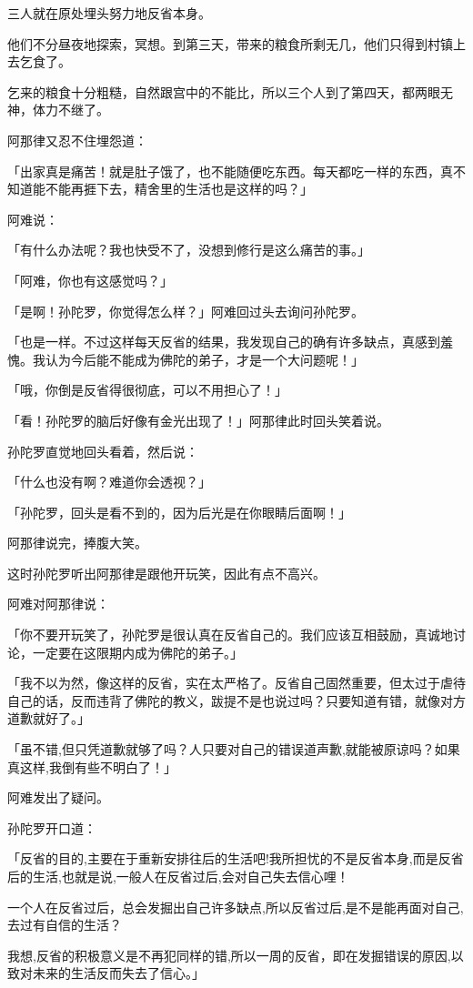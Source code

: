 \documentclass[twoside,openany]{book}
\begin{document}
三人就在原处埋头努力地反省本身。

他们不分昼夜地探索，冥想。到第三天，带来的粮食所剩无几，他们只得到村镇上去乞食了。

乞来的粮食十分粗糙，自然跟宫中的不能比，所以三个人到了第四天，都两眼无神，体力不继了。

阿那律又忍不住埋怨道：

「出家真是痛苦！就是肚子饿了，也不能随便吃东西。每天都吃一样的东西，真不知道能不能再捱下去，精舍里的生活也是这样的吗？」

阿难说：

「有什么办法呢？我也快受不了，没想到修行是这么痛苦的事。」

「阿难，你也有这感觉吗？」

「是啊！孙陀罗，你觉得怎么样？」阿难回过头去询问孙陀罗。

「也是一样。不过这样每天反省的结果，我发现自己的确有许多缺点，真感到羞愧。我认为今后能不能成为佛陀的弟子，才是一个大问题呢！」

「哦，你倒是反省得很彻底，可以不用担心了！」

「看！孙陀罗的脑后好像有金光出现了！」阿那律此时回头笑着说。

孙陀罗直觉地回头看着，然后说：

「什么也没有啊？难道你会透视？」

「孙陀罗，回头是看不到的，因为后光是在你眼睛后面啊！」

阿那律说完，捧腹大笑。

这时孙陀罗听出阿那律是跟他开玩笑，因此有点不高兴。

阿难对阿那律说：

「你不要开玩笑了，孙陀罗是很认真在反省自己的。我们应该互相鼓励，真诚地讨论，一定要在这限期内成为佛陀的弟子。」

「我不以为然，像这样的反省，实在太严格了。反省自己固然重要，但太过于虐待自己的话，反而违背了佛陀的教义，跋提不是也说过吗？只要知道有错，就像对方道歉就好了。」

「虽不错,但只凭道歉就够了吗？人只要对自己的错误道声歉,就能被原谅吗？如果真这样,我倒有些不明白了！」

阿难发出了疑问。

孙陀罗开口道：

「反省的目的,主要在于重新安排往后的生活吧!我所担忧的不是反省本身,而是反省后的生活,也就是说,一般人在反省过后,会对自己失去信心哩！

一个人在反省过后，总会发掘出自己许多缺点,所以反省过后,是不是能再面对自己,去过有自信的生活？

我想,反省的积极意义是不再犯同样的错,所以一周的反省，即在发掘错误的原因,以致对未来的生活反而失去了信心。」
\end{document}
